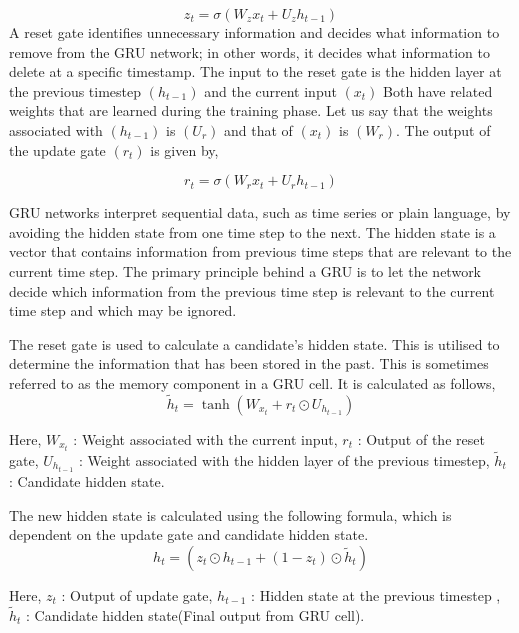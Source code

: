 \begin{equation}
  z_t = \sigma(W_z x_t + U_z h_{t-1})
\end{equation}
A reset gate identifies unnecessary information and decides what information to remove from the GRU network; in other words,  it decides what information to delete at a specific timestamp. The input to the reset gate is the hidden layer at the previous timestep $(h_{t-1})$ and the current input $( x_t )$ 
Both have related weights that are learned during the training phase.  Let us say that the weights associated with $(h_{t-1})$ is $(U_r)$ and that of  $( x_t )$ is $(W_r)$.  The output of the update gate $( r_t )$ is given by, 

\begin{equation}
  r_t = \sigma(W_r x_t + U_r h_{t-1})
\end{equation}

GRU networks interpret sequential data,  such as time series or plain language,  by avoiding the hidden state from one time step to the next. The hidden state is a vector that contains information from previous time steps that are relevant to the current time step. The primary principle behind a GRU is to let the network decide which information from the previous time step is relevant to the current time step and which may be ignored.


The reset gate is used to calculate a candidate's hidden state. This is utilised to determine the information that has been stored in the past. This is sometimes referred to as the memory component in a GRU cell. It is calculated as follows, 
\begin{equation}
  \tilde{h}_t = \tanh(W_{x_{t}} + r_t \odot U_{h_{t-1}})
\end{equation}

Here,  $W_{x_{t}}$ : Weight associated with the current input,  $r_t$ : Output of the reset gate,  $U_{h_{t-1}}$ : Weight associated with the hidden layer of the previous timestep,  $\tilde{h}_t$ : Candidate hidden state.



The new hidden state is calculated using the following formula,  which is dependent on the update gate and candidate hidden state.
\begin{equation}
  {h}_t = ( z_t \odot h_{t-1} + (1- z_t)\odot \tilde{h}_t)
\end{equation}

Here,  $z_t$ : Output of update gate,  $h_{t-1}$ : Hidden state at the previous timestep , $\tilde{h}_t$ : Candidate hidden state(Final output from GRU cell).

